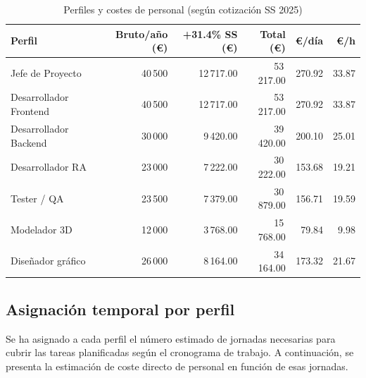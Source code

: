 \begin{table}[H]
\centering
\caption{Perfiles y costes de personal (según cotización SS 2025)}
\begin{tabular}{|l|r|r|r|r|r|}
\hline
\textbf{Perfil} & \textbf{Bruto/año (€)} & \textbf{+31.4\% SS (€)} & \textbf{Total (€)} & \textbf{€/día} & \textbf{€/h} \\
\hline
Jefe de Proyecto        & 40\,500 & 12\,717.00 & 53\,217.00 & 270.92 & 33.87 \\
Desarrollador Frontend  & 40\,500 & 12\,717.00 & 53\,217.00 & 270.92 & 33.87 \\
Desarrollador Backend   & 30\,000 & 9\,420.00  & 39\,420.00 & 200.10 & 25.01 \\
Desarrollador RA        & 23\,000 & 7\,222.00  & 30\,222.00 & 153.68 & 19.21 \\
Tester / QA             & 23\,500 & 7\,379.00  & 30\,879.00 & 156.71 & 19.59 \\
Modelador 3D            & 12\,000 & 3\,768.00  & 15\,768.00 & 79.84  & 9.98  \\
Diseñador gráfico       & 26\,000 & 8\,164.00  & 34\,164.00 & 173.32 & 21.67 \\
\hline
\end{tabular}
\end{table}



\subsection{Asignación temporal por perfil}

Se ha asignado a cada perfil el número estimado de jornadas necesarias para cubrir las tareas planificadas según el cronograma de trabajo. A continuación, se presenta la estimación de coste directo de personal en función de esas jornadas.

